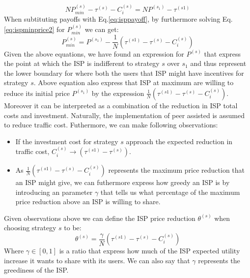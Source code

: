 \documentclass[paper]{ieice}
\begin{document}
\begin{equation}\label{eq:ispminprice2}
	N P^{(s)}_{min} - \tau^{(s)} - C^{(s)}_i = N P^{(s_1)} - \tau^{(s1)}  
\end{equation}
When subtituting payoffs with Eq.\ref{eq:isppayoff}, by furthermore solving Eq.\ref{eq:ispminprice2} for $P^{(s)}_{min}$ we can get:
\begin{equation}\label{eq:ispminprice3}
	P^{(s)}_{min} = P^{(s_1)} - \frac{1}{N} ( \tau^{(s1)} - \tau^{(s)} -  C^{(s)}_i  )
\end{equation}
Given the above equations, we have found an expression for $P^{(s)}$ that express the point at which the ISP is indifferent to strategy $s$ over $s_1$ and thus represent the lower boundary for where both the users that ISP might have incentives for strategy $s$. 
Above equation also express that ISP at maximum are willing to reduce its initial price $P^{(s_1)}$ by the expression $\frac{1}{N} ( \tau^{(s1)} - \tau^{(s)} -  C^{(s)}_i  )$.
Moreover it can be interpreted as a combination of the reduction in ISP total costs and investment.
Naturally, the implementation of peer assisted is assumed to reduce traffic cost.  
Futhermore, we can make following observations:
\begin{itemize}
	\item If the investment cost for strategy $s$ approach the expected reduction in traffic cost, $C^{(s)}_i \to (\tau^{(s1)} - \tau^{(s)})$.
	\item As $\frac{1}{N} ( \tau^{(s1)} - \tau^{(s)} -  C^{(s)}_i )$ represents the maximum price reduction that an ISP might give, we can futhermore express how greedy an ISP is by introducing an parameter $\gamma$ that tells us what percentage of the maximum price reduction above an ISP is willing to share.  
\end{itemize}
Given observations above we can define the ISP price reduction $\theta^{(s)}$ when choosing strategy $s$ to be:
\begin{equation}
 \theta^{(s)} = \frac{\gamma}{N} ( \tau^{(s1)} - \tau^{(s)} -  C^{(s)}_i  )
\end{equation}
Where $\gamma \in [0,1]$ is a ratio that express how much of the ISP expected utility increase it wants to share with its users.   
We can also say that $\gamma$ represents the greediness of the ISP.
\end{document}
